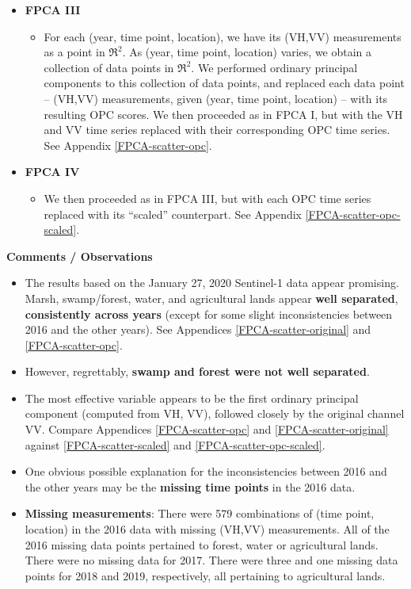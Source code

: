 \begin{itemize}
\item
	\textbf{FPCA III}
	\begin{itemize}
	\item
		For each (year, time point, location), we have its (VH,VV) measurements as a point in $\Re^{2}$.
		As (year, time point, location) varies, we obtain a collection of data points in $\Re^{2}$.
		We performed ordinary principal components to this collection of data points,
		and replaced each data point -- (VH,VV) measurements, given (year, time point, location) --
		with its resulting OPC scores.
		We then proceeded as in FPCA I, but with the VH and VV time series replaced
		with their corresponding OPC time series.
		See Appendix \ref{FPCA-scatter-opc}.
	\end{itemize}

\item
	\textbf{FPCA IV}
	\begin{itemize}
	\item
		We then proceeded as in FPCA III, but with each OPC time series replaced
		with its ``scaled'' counterpart.
		See Appendix \ref{FPCA-scatter-opc-scaled}.
	\end{itemize}
\end{itemize}


\vskip 0.5cm
\noindent
\textbf{Comments / Observations}
\begin{itemize}
\item
	The results based on the January 27, 2020 Sentinel-1 data appear promising.
	Marsh, swamp/forest, water, and agricultural lands appear \textbf{well separated},
	\textbf{consistently across years}
	(except for some slight inconsistencies between 2016 and the other years).
	See Appendices \ref{FPCA-scatter-original} and \ref{FPCA-scatter-opc}.
\item
	However, regrettably, \textbf{\color{red}swamp and forest were not well separated}.
\item
	The most effective variable appears to be the first ordinary principal component (computed from VH, VV),
	followed closely by the original channel VV.
	Compare Appendices \ref{FPCA-scatter-opc} and \ref{FPCA-scatter-original}
	against \ref{FPCA-scatter-scaled} and \ref{FPCA-scatter-opc-scaled}.
\item
	One obvious possible explanation for the inconsistencies between 2016 and the other years
	may be the \textbf{\color{red}missing time points} in the 2016 data.
\item
	\textbf{\color{red}Missing measurements}:
	There were 579 combinations of (time point, location) in the 2016 data with missing (VH,VV) measurements. 
	All of the 2016 missing data points pertained to forest, water or agricultural lands.
	There were no missing data for 2017.
	There were three and one missing data points for 2018 and 2019, respectively, all pertaining to agricultural lands.
\end{itemize}


\renewcommand{\theenumi}{\roman{enumi}}
\renewcommand{\labelenumi}{\textnormal{(\theenumi)}$\;\;$}

